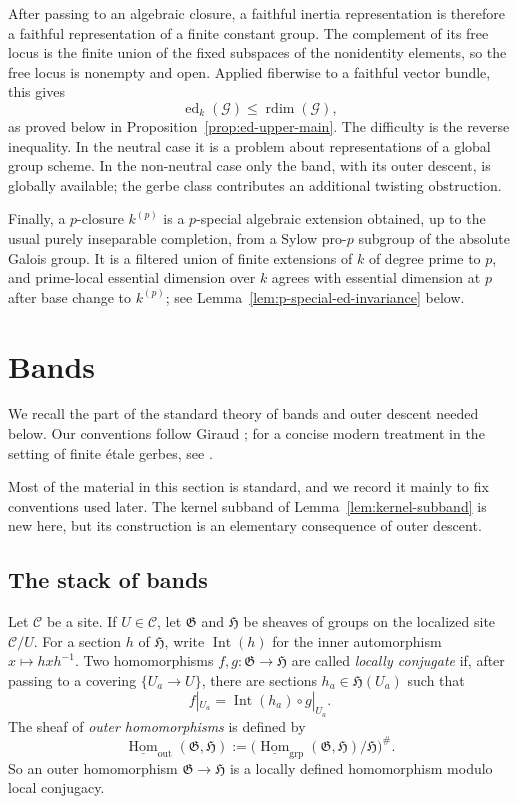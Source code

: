 \documentclass[11pt,reqno]{amsart}
\numberwithin{equation}{section}
\theoremstyle{plain}
\theoremstyle{definition}
\def\cG{{\mathcal G}}
\def\fG{{\mathfrak G}}
\def\fH{{\mathfrak H}}
\def\Hom{{\operatorname{Hom}}}
\def\rdim{{\operatorname{rdim}}}
\def\ed{{\operatorname{ed}}}
\begin{document}
After passing to an algebraic closure, a faithful inertia
representation is therefore a faithful representation of a finite constant
group.  The complement of its free locus is the finite union of the fixed
subspaces of the nonidentity elements, so the free locus is nonempty and
open.  Applied fiberwise to a faithful vector bundle, this gives
\[
\ed_k(\cG)\le\rdim(\cG),
\]
as proved below in Proposition~\ref{prop:ed-upper-main}.  The difficulty is
the reverse inequality.  In the neutral case it is a problem about
representations of a global group scheme.  In the non-neutral case only the
band, with its outer descent, is globally available; the gerbe class
contributes an additional twisting obstruction.

Finally, a $p$-closure $k^{(p)}$ is a $p$-special algebraic extension
obtained, up to the usual purely inseparable completion, from a Sylow
pro-$p$ subgroup of the absolute Galois group.  It is a filtered union
of finite extensions of $k$ of degree prime to $p$, and prime-local
essential dimension over $k$ agrees with essential dimension at $p$ after
base change to $k^{(p)}$; see Lemma~\ref{lem:p-special-ed-invariance} below.

\section{Bands}\label{sec:bands}

We recall the part of the standard theory of bands and outer descent
needed below.  Our conventions follow Giraud
\cite[Chapter~IV, Sections~1.1 and~2.2]{Giraud}; for a concise modern
treatment in the setting of finite \'etale gerbes, see
\cite[Section~3.1]{JavanpeykarLoughran}.

Most of the material in this section is standard, and we record it mainly to
fix conventions used later.  The kernel subband of
Lemma~\ref{lem:kernel-subband} is new here, but its construction is an
elementary consequence of outer descent.

\subsection{The stack of bands}

Let $\mathcal C$ be a site.  If $U\in\mathcal C$, let $\fG$ and
$\fH$ be sheaves of groups on the localized site $\mathcal C/U$.
For a section $h$ of $\fH$, write $\operatorname{Int}(h)$ for the
inner automorphism $x\mapsto hxh^{-1}$.
Two homomorphisms $f,g:\fG\to\fH$ are called
\emph{locally conjugate} if, after passing to a covering
$\{U_a\to U\}$, there are sections $h_a\in\fH(U_a)$ such that
\[
f|_{U_a}=\operatorname{Int}(h_a)\circ g|_{U_a}.
\]
The sheaf of \emph{outer homomorphisms} is defined by
\[
\underline{\Hom}_{\mathrm{out}}(\fG,\fH)
:=
\bigl(
\underline{\Hom}_{\mathrm{grp}}(\fG,\fH)/\fH
\bigr)^{\#}.
\]
So an outer homomorphism $\fG\to\fH$ is a locally defined homomorphism modulo local
conjugacy.
\end{document}
